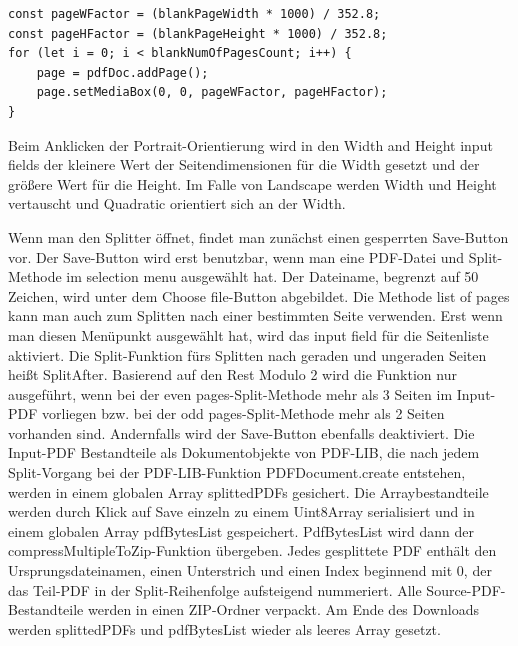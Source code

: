 \begin{lstlisting}[style=ES6, caption={Berechnung der PDF-Seitengröße}, label=code:mediabox, breaklines=true]
const pageWFactor = (blankPageWidth * 1000) / 352.8;
const pageHFactor = (blankPageHeight * 1000) / 352.8;
for (let i = 0; i < blankNumOfPagesCount; i++) {
	page = pdfDoc.addPage();
	page.setMediaBox(0, 0, pageWFactor, pageHFactor);
}
\end{lstlisting} 

Beim Anklicken der Portrait-Orientierung wird in den Width and Height input fields der kleinere Wert der Seitendimensionen für die Width gesetzt und der größere Wert für die Height. Im Falle von Landscape werden Width und Height vertauscht und Quadratic orientiert sich an der Width.
\par
Wenn man den Splitter öffnet, findet man zunächst einen gesperrten Save-Button vor. Der Save-Button wird erst benutzbar, wenn man eine PDF-Datei und Split-Methode im selection menu ausgewählt hat. Der Dateiname, begrenzt auf 50 Zeichen, wird unter dem Choose file-Button abgebildet. Die Methode list of pages kann man auch zum Splitten nach einer bestimmten Seite verwenden. Erst wenn man diesen Menüpunkt ausgewählt hat, wird das input field für die Seitenliste aktiviert. Die Split-Funktion fürs Splitten nach geraden und ungeraden Seiten heißt SplitAfter. Basierend auf den Rest Modulo 2 wird die Funktion nur ausgeführt, wenn bei der even pages-Split-Methode mehr als 3 Seiten im Input-PDF vorliegen bzw. bei der odd pages-Split-Methode mehr als 2 Seiten vorhanden sind. Andernfalls wird der Save-Button ebenfalls deaktiviert. Die Input-PDF Bestandteile als Dokumentobjekte von PDF-LIB, die nach jedem Split-Vorgang bei der PDF-LIB-Funktion PDFDocument.create entstehen, werden in einem globalen Array splittedPDFs gesichert. Die Arraybestandteile werden durch Klick auf Save einzeln zu einem Uint8Array serialisiert und in einem globalen Array pdfBytesList gespeichert. PdfBytesList wird dann der compressMultipleToZip-Funktion übergeben. Jedes gesplittete PDF enthält den Ursprungsdateinamen, einen Unterstrich und einen Index beginnend mit 0, der das Teil-PDF in der Split-Reihenfolge aufsteigend nummeriert. Alle Source-PDF-Bestandteile werden in einen ZIP-Ordner verpackt. Am Ende des Downloads werden splittedPDFs und pdfBytesList wieder als leeres Array gesetzt.
\par
